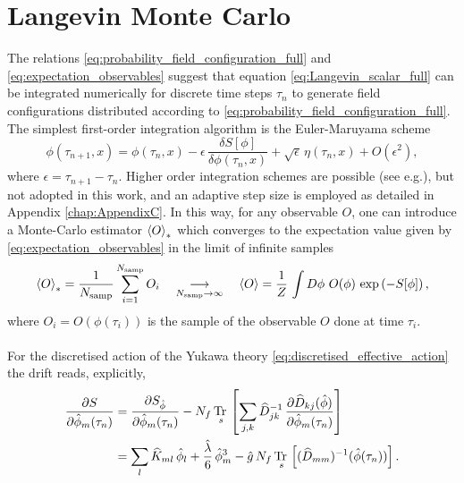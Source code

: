\section{Langevin Monte Carlo}
\label{sec:langevin_monte_carlo}
The relations \eqref{eq:probability_field_configuration_full} and \eqref{eq:expectation_observables} suggest that equation \eqref{eq:Langevin_scalar_full} can be integrated numerically for discrete time steps $\tau_n$ to generate field configurations distributed according to \eqref{eq:probability_field_configuration_full}. 
The simplest first-order integration algorithm is the Euler-Maruyama scheme \cite{ParisiWu}
\begin{equation*}
    \phi(\tau_{n+1}, x) = \phi(\tau_{n}, x) - \epsilon \,  \frac{\delta S[\phi]}{\delta \phi (\tau_n, x)} + \sqrt{\epsilon} \, \eta(\tau_n, x) + O(\epsilon^2),
\end{equation*}
where $\epsilon = \tau_{n+1} - \tau_n$. Higher order integration schemes are possible (see e.g.\cite{bilinearnoise1,Kronfeld1993}), but not adopted in this work, and an adaptive step size is employed as detailed in Appendix \ref{chap:AppendixC}.
In this way, for any observable $O$, one can introduce a Monte-Carlo estimator $\left\langle O \right\rangle_*$ which converges to the expectation value given by \eqref{eq:expectation_observables} in the limit of infinite samples
\begin{equation}
    \expect{O}_{*} = \frac{1}{N_\text{samp}} \sum^{N_\text{samp}}_{i=1} O_i \quad \underset{N_\text{samp} \to \infty}{\longrightarrow} \quad \expect{O} = \frac{1}{Z} \, \int D\phi \ O(\phi) \, \exp\left(-S[\phi]\right),
    \label{eq:monte_carlo_estimator}
\end{equation}
where $O_i = O(\phi(\tau_i))$ is the sample of the observable $O$ done at time $\tau_i$. \\~\\
For the discretised action of the Yukawa theory \eqref{eq:discretised_effective_action} the drift reads, explicitly,
\begin{equation}
    \begin{aligned}
        \frac{\partial S}{\partial \hat{\phi}_m(\tau_n)} &= \frac{\partial S_{\hat{\phi}}}{\partial \hat{\phi}_m(\tau_n)} - N_f \, \underset{s}{\operatorname{\text{Tr} \,}} \left[\sum_{j,k} \widehat{D}^{-1}_{jk}  \, \frac{\partial \widehat{D}_{kj}(\hat{\phi})}{\partial \hat{\phi}_m(\tau_n)}\right] \\
        &= \sum_l \widehat{K}_{ml} \, \hat\phi_l + \frac{\hat\lambda}{6} \, \hat\phi_m^3 - \hat g \, N_f \, \underset{s}{\operatorname{\text{Tr} \,}} \left[(\widehat{D}_{mm})^{-1}(\hat{\phi}(\tau_n))\right].
    \end{aligned}
    \label{eq:drift_continuum_full_theory}
\end{equation}
